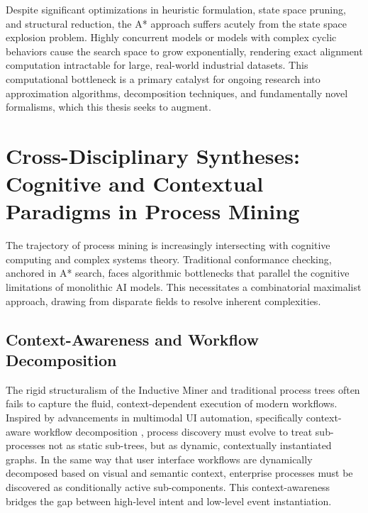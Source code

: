Despite significant optimizations in heuristic formulation, state space pruning, and structural reduction, the A* approach suffers acutely from the state space explosion problem. Highly concurrent models or models with complex cyclic behaviors cause the search space to grow exponentially, rendering exact alignment computation intractable for large, real-world industrial datasets. This computational bottleneck is a primary catalyst for ongoing research into approximation algorithms, decomposition techniques, and fundamentally novel formalisms, which this thesis seeks to augment.

\section{Cross-Disciplinary Syntheses: Cognitive and Contextual Paradigms in Process Mining}
The trajectory of process mining is increasingly intersecting with cognitive computing and complex systems theory. Traditional conformance checking, anchored in A* search, faces algorithmic bottlenecks that parallel the cognitive limitations of monolithic AI models. This necessitates a combinatorial maximalist approach, drawing from disparate fields to resolve inherent complexities.

\subsection{Context-Awareness and Workflow Decomposition}
The rigid structuralism of the Inductive Miner and traditional process trees often fails to capture the fluid, context-dependent execution of modern workflows. Inspired by advancements in multimodal UI automation, specifically context-aware workflow decomposition \cite{ref_ContextAwareWor12}, process discovery must evolve to treat sub-processes not as static sub-trees, but as dynamic, contextually instantiated graphs. In the same way that user interface workflows are dynamically decomposed based on visual and semantic context, enterprise processes must be discovered as conditionally active sub-components. This context-awareness bridges the gap between high-level intent and low-level event instantiation.

